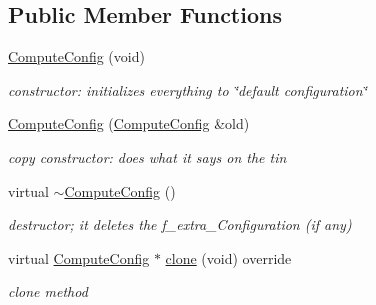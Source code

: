 \subsection*{Public Member Functions}
\begin{DoxyCompactItemize}
\item 
\mbox{\label{class_s_m_spp__di__unipi__it_1_1_compute_config_a432dc21e16936070fa3030dde3edb585}} 
\mbox{\hyperlink{class_s_m_spp__di__unipi__it_1_1_compute_config_a432dc21e16936070fa3030dde3edb585}{Compute\+Config}} (void)
\begin{DoxyCompactList}\small\item\em constructor\+: initializes everything to \char`\"{}default configuration\char`\"{} \end{DoxyCompactList}\item 
\mbox{\label{class_s_m_spp__di__unipi__it_1_1_compute_config_a184ccbe43ac304a2b1398ab9f170feee}} 
\mbox{\hyperlink{class_s_m_spp__di__unipi__it_1_1_compute_config_a184ccbe43ac304a2b1398ab9f170feee}{Compute\+Config}} (\mbox{\hyperlink{class_s_m_spp__di__unipi__it_1_1_compute_config}{Compute\+Config}} \&old)
\begin{DoxyCompactList}\small\item\em copy constructor\+: does what it says on the tin \end{DoxyCompactList}\item 
\mbox{\label{class_s_m_spp__di__unipi__it_1_1_compute_config_ac522dd12ec9a2f918d1daff80dfeaf76}} 
virtual \mbox{\hyperlink{class_s_m_spp__di__unipi__it_1_1_compute_config_ac522dd12ec9a2f918d1daff80dfeaf76}{$\sim$\+Compute\+Config}} ()
\begin{DoxyCompactList}\small\item\em destructor; it deletes the f\+\_\+extra\+\_\+\+Configuration (if any) \end{DoxyCompactList}\item 
\mbox{\label{class_s_m_spp__di__unipi__it_1_1_compute_config_afab10dc29991f0b9078db7255c5795b3}} 
virtual \mbox{\hyperlink{class_s_m_spp__di__unipi__it_1_1_compute_config}{Compute\+Config}} $\ast$ \mbox{\hyperlink{class_s_m_spp__di__unipi__it_1_1_compute_config_afab10dc29991f0b9078db7255c5795b3}{clone}} (void) override
\begin{DoxyCompactList}\small\item\em clone method \end{DoxyCompactList}\end{DoxyCompactItemize}
